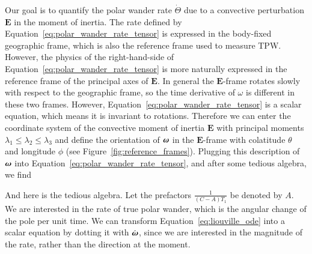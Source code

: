 \documentclass[preprint,12pt,authoryear]{elsarticle}
\newcommand{\mitbf}[1]{\hbox{\mathversion{bold}$#1$}}
\newif\ifdetail
\begin{document}
Our goal is to quantify the polar wander rate $\dot{\Theta}$ due to a convective perturbation $\mathbf{E}$ in the moment of inertia. 
The rate defined by Equation~\eqref{eq:polar_wander_rate_tensor} is expressed in the body-fixed geographic frame, 
which is also the reference frame used to measure TPW. 
However, the physics of the right-hand-side of Equation~\eqref{eq:polar_wander_rate_tensor} 
is more naturally expressed in the reference frame of the principal axes of $\mathbf{E}$. 
In general the $\mathbf{E}$-frame rotates slowly with respect to the geographic frame, so the time derivative of $\omega$ is different in these two frames.
However, Equation~\eqref{eq:polar_wander_rate_tensor} is a scalar equation, which means it is invariant to rotations.
Therefore we can enter the coordinate system of the convective moment of inertia $\mathbf{E}$ 
with principal moments $\lambda_1 \le \lambda_2 \le \lambda_3$ and define the orientation of 
$\mitbf{\omega}$ in the $\mathbf{E}$-frame with colatitude $\theta$ and longitude $\phi$ (see Figure~\ref{fig:reference_frames}).
Plugging this description of $\mitbf{\omega}$ into Equation~\eqref{eq:polar_wander_rate_tensor},
and after some tedious algebra, we find
\ifdetail

And here is the tedious algebra.  Let the prefactors $\frac{1}{(C-A)T_1}$ be denoted by $A$.
We are interested in the rate of true polar wander, which is the angular change of the pole
per unit time. We can transform Equation~\eqref{eq:liouville_ode} into a scalar equation by dotting it
with $\dot{\mitbf{\omega}}$, since we are interested in the magnitude of the rate, rather than
the direction at the moment.
\end{document}
